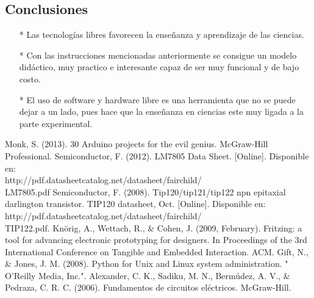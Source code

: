 \documentclass[12]{article}
\begin{document}
\begin{multicols}{2}
\section{Conclusiones}
\begin{enumerate}
\item[*] Las tecnologías libres favorecen la enseñanza y aprendizaje de las ciencias.
\item[*] Con las instrucciones mencionadas anteriormente se consigue un modelo didáctico, muy practico  e interesante capaz de ser muy funcional y de bajo costo.
\item[*] El uso de software y hardware libre es una herramienta que no se puede dejar a un lado, pues hace que la enseñanza en ciencias este muy ligada a la parte experimental.
\end{enumerate}

\begin{thebibliography}{99}
 Monk, S. (2013). 30 Arduino projects for the evil genius. McGraw-Hill Professional.
 Semiconductor, F. (2012). LM7805 Data Sheet. [Online]. Disponible en:\\ http://pdf.datasheetcatalog.net/datasheet/fairchild/\\LM7805.pdf
 Semiconductor, F. (2008). Tip120/tip121/tip122 npn epitaxial darlington transistor. TIP120 datasheet, Oct. [Online]. Disponible en:\\ http://pdf.datasheetcatalog.net/datasheet/fairchild/\\TIP122.pdf.
 Knörig, A., Wettach, R., \& Cohen, J. (2009, February). Fritzing: a tool for advancing electronic prototyping for designers. In Proceedings of the 3rd International Conference on Tangible and Embedded Interaction. ACM.
 Gift, N., \& Jones, J. M. (2008). Python for Unix and Linux system administration. " O'Reilly Media, Inc.".
 Alexander, C. K., Sadiku, M. N., Bermúdez, A. V., \& Pedraza, C. R. C. (2006). Fundamentos de circuitos eléctricos. McGraw-Hill. 

\end{thebibliography}
\end{multicols}
\end{document}
